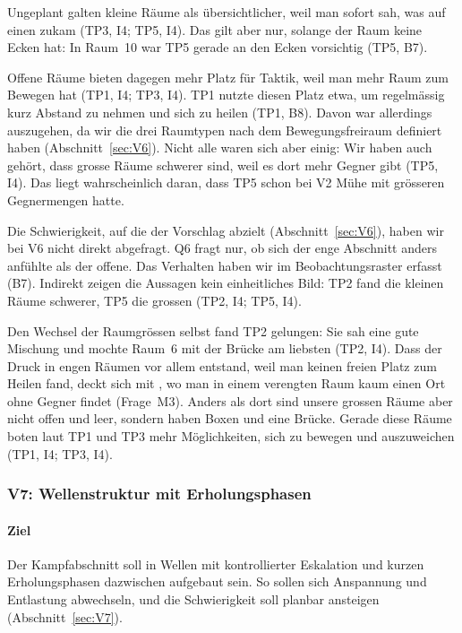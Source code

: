 \documentclass[../Main.tex]{subfiles}
\begin{document}
Ungeplant galten kleine Räume als übersichtlicher, weil man sofort sah, was auf einen zukam (TP3, I4; TP5, I4). Das gilt aber nur, solange der Raum keine Ecken hat: In Raum~10 war TP5 gerade an den Ecken vorsichtig (TP5, B7).

Offene Räume bieten dagegen mehr Platz für Taktik, weil man mehr Raum zum Bewegen hat (TP1, I4; TP3, I4). TP1 nutzte diesen Platz etwa, um regelmässig kurz Abstand zu nehmen und sich zu heilen (TP1, B8). Davon war allerdings auszugehen, da wir die drei Raumtypen nach dem Bewegungsfreiraum definiert haben (Abschnitt~\ref{sec:V6}). Nicht alle waren sich aber einig: Wir haben auch gehört, dass grosse Räume schwerer sind, weil es dort mehr Gegner gibt (TP5, I4). Das liegt wahrscheinlich daran, dass TP5 schon bei V2 Mühe mit grösseren Gegnermengen hatte.

Die Schwierigkeit, auf die der Vorschlag abzielt (Abschnitt~\ref{sec:V6}), haben wir bei V6 nicht direkt abgefragt. Q6 fragt nur, ob sich der enge Abschnitt anders anfühlte als der offene. Das Verhalten haben wir im Beobachtungsraster erfasst (B7). Indirekt zeigen die Aussagen kein einheitliches Bild: TP2 fand die kleinen Räume schwerer, TP5 die grossen (TP2, I4; TP5, I4).

Den Wechsel der Raumgrössen selbst fand TP2 gelungen: Sie sah eine gute Mischung und mochte Raum~6 mit der Brücke am liebsten (TP2, I4). Dass der Druck in engen Räumen vor allem entstand, weil man keinen freien Platz zum Heilen fand, deckt sich mit , wo man in einem verengten Raum kaum einen Ort ohne Gegner findet (Frage~M3). Anders als dort sind unsere grossen Räume aber nicht offen und leer, sondern haben Boxen und eine Brücke.  Gerade diese Räume boten laut TP1 und TP3 mehr Möglichkeiten, sich zu bewegen und auszuweichen (TP1, I4; TP3, I4).

\subsubsection{V7: Wellenstruktur mit Erholungsphasen}

\paragraph{Ziel}
Der Kampfabschnitt soll in Wellen mit kontrollierter Eskalation und kurzen Erholungsphasen dazwischen aufgebaut sein. So sollen sich Anspannung und Entlastung abwechseln, und die Schwierigkeit soll planbar ansteigen (Abschnitt~\ref{sec:V7}).
\end{document}
